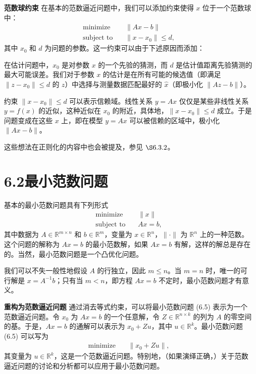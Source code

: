 \documentclass[UTF8, 12pt, fontset=fandol, oneside]{ctexart}
\begin{document}
\noindent\textbf{范数球约束}\quad
在基本的范数逼近问题中，我们可以添加约束使得 $x$ 位于一个范数球中：
\[
\begin{aligned}
\text{minimize}\quad & \|Ax-b\|\\
\text{subject to}\quad & \|x-x_0\|\leq d,
\end{aligned}
\]
其中 $x_0$ 和 $d$ 为问题的参数。这一约束可以由于下述原因而添加：

在估计问题中，$x_0$ 是对参数 $x$ 的一个先验的猜测，而 $d$ 是估计值距离先验猜测的最大可能误差。我们对于参数 $x$ 的估计是在所有可能的候选值（即满足 $\|z-x_0\|\leq d$ 的 $z$）中选择与测量数据匹配最好的 $\hat{x}$（即极小化 $\|Az-b\|$）。

约束 $\|x-x_0\|\leq d$ 可以表示信赖域。线性关系 $y=Ax$ 仅仅是某些非线性关系 $y=f(x)$ 的近似，这种近似在 $x_0$ 的附近，具体地，$\|x-x_0\|\leq d$ 成立。于是问题变成在这些 $x$ 上，即在模型 $y=Ax$ 可以被信赖的区域中，极小化 $\|Ax-b\|$。

这些想法在正则化的内容中也会被提及，参见 $\S 6.3.2$。

\section*{6.2\quad 最小范数问题}

基本的最小范数问题具有下列形式
\begin{equation}
\begin{aligned}
\text{minimize}\quad & \|x\|\\
\text{subject to}\quad & Ax=b,
\end{aligned}
\tag{6.5}
\end{equation}
其中数据为 $A\in\mathbb{R}^{m\times n}$ 和 $b\in\mathbb{R}^m$，变量为 $x\in\mathbb{R}^n$，$\|\cdot\|$ 为 $\mathbb{R}^n$ 上的一种范数。这个问题的解称为 $Ax=b$ 的最小范数解，如果 $Ax=b$ 有解，这样的解总是存在的。当然，最小范数问题是一个凸优化问题。

我们可以不失一般性地假设 $A$ 的行独立，因此 $m\leq n$。当 $m=n$ 时，唯一的可行解是 $x=A^{-1}b$；只有当 $m<n$，即方程 $Ax=b$ 不定时，最小范数问题才有意义。

\noindent\textbf{重构为范数逼近问题}\quad
通过消去等式约束，可以将最小范数问题 (6.5) 表示为一个范数逼近问题。令 $x_0$ 为 $Ax=b$ 的一个任意解，令 $Z\in\mathbb{R}^{n\times k}$ 的列为 $A$ 的零空间的基。于是，$Ax=b$ 的通解可以表示为 $x_0+Zu$，其中 $u\in\mathbb{R}^k$。最小范数问题 (6.5) 可以写为
\[
\begin{aligned}
\text{minimize}\quad & \|x_0+Zu\|,
\end{aligned}
\]
其变量为 $u\in\mathbb{R}^k$，这是一个范数逼近问题。特别地，（如果演绎正确，）关于范数逼近问题的讨论和分析都可以应用于最小范数问题。
\end{document}
